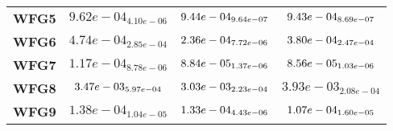 \documentclass{article}
\begin{document}
\begin{table}[!htp]
\begin{scriptsize}
\begin{tabular}{c|ccc}
      \textbf{WFG5} & $9.62e-04_{4.10e-06} $ & $ \cellcolor{gray25} 9.44e-04_{9.64e-07} $ & $ \cellcolor{gray95} 9.43e-04_{8.69e-07}$ \\
      \textbf{WFG6} & $4.74e-04_{2.85e-04} $ & $ \cellcolor{gray95} 2.36e-04_{7.72e-06} $ & $ \cellcolor{gray25} 3.80e-04_{2.47e-04}$ \\
      \textbf{WFG7} & $1.17e-04_{8.78e-06} $ & $ \cellcolor{gray25} 8.84e-05_{1.37e-06} $ & $ \cellcolor{gray95} 8.56e-05_{1.03e-06}$ \\
      \textbf{WFG8} & $\cellcolor{gray25} 3.47e-03_{5.97e-04} $ & $ \cellcolor{gray95} 3.03e-03_{2.23e-04} $ & $ 3.93e-03_{2.08e-04}$ \\
      \textbf{WFG9} & $1.38e-04_{1.04e-05} $ & $ \cellcolor{gray25} 1.33e-04_{4.43e-06} $ & $ \cellcolor{gray95} 1.07e-04_{1.60e-05}$ \\
  \end{tabular}
  \end{scriptsize}
\end{table}
\end{document}
